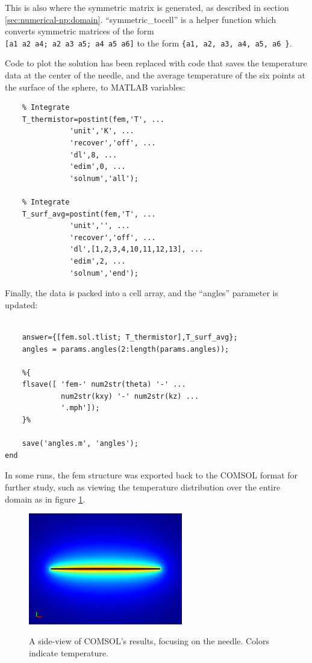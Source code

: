 This is also where the symmetric matrix is generated, as described in section
\ref{sec:numerical-np:domain}. ``symmetric\_tocell'' is a helper function which
converts symmetric matrices of the form \\
\texttt{[a1 a2 a4; a2 a3 a5; a4 a5 a6]} to the form \texttt{\{a1, a2, a3, a4, a5, a6 \}}.

Code to plot the solution has been replaced with code that saves the
temperature data at the center of the needle, and the average temperature of the
six points at the surface of the sphere, to MATLAB variables:

\small
\begin{verbatim}
    % Integrate
    T_thermistor=postint(fem,'T', ...
               'unit','K', ...
               'recover','off', ...
               'dl',8, ...
               'edim',0, ...
               'solnum','all');

    % Integrate
    T_surf_avg=postint(fem,'T', ...
               'unit','', ...
               'recover','off', ...
               'dl',[1,2,3,4,10,11,12,13], ...
               'edim',2, ...
               'solnum','end');
\end{verbatim}
\normalsize

Finally, the data is packed into a cell array, and the ``angles'' parameter
is updated:

\small
\begin{verbatim}

    answer={[fem.sol.tlist; T_thermistor],T_surf_avg};
    angles = params.angles(2:length(params.angles));

    %{
    flsave([ 'fem-' num2str(theta) '-' ...
             num2str(kxy) '-' num2str(kz) ...
             '.mph']);
    }%

    save('angles.m', 'angles');
end
\end{verbatim}
\normalsize

In some runs, the fem structure was exported back to the COMSOL format for
further study, such as viewing the temperature distribution over the entire
domain as in figure \ref{fig:comsol}.

\begin{figure}[h]
\centering
\includegraphics[width=0.6\textwidth]{fig/35892_elem_1097s.png}
\label{fig:comsol}
\caption{A side-view of COMSOL's results, focusing on the needle. Colors indicate temperature.}
\end{figure}


